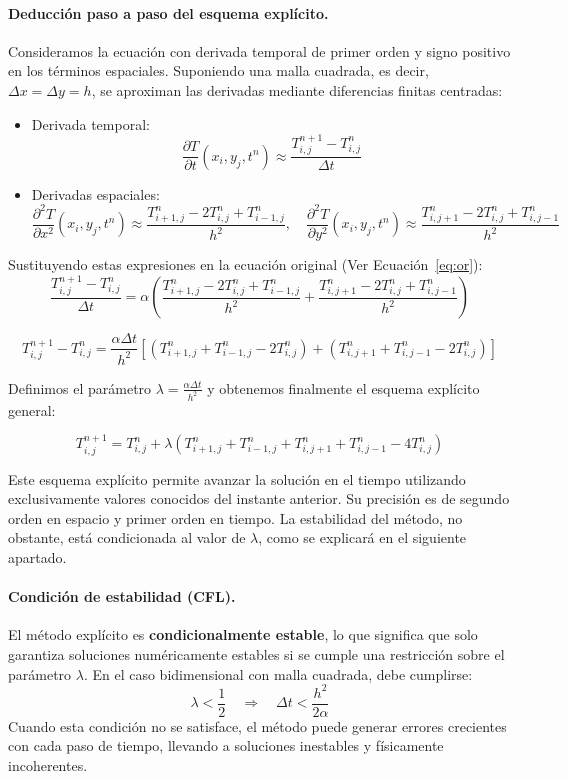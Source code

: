 \documentclass{article}
\begin{document}
\paragraph{Deducción paso a paso del esquema explícito.}
Consideramos la ecuación con derivada temporal de primer orden y signo positivo en los términos espaciales. Suponiendo una malla cuadrada, es decir, $\Delta x = \Delta y = h$, se aproximan las derivadas mediante diferencias finitas centradas:

\begin{itemize}
    \item Derivada temporal:
    $$
    \frac{\partial T}{\partial t}(x_i, y_j, t^n) \approx \frac{T_{i,j}^{n+1} - T_{i,j}^{n}}{\Delta t}
    $$
    \item Derivadas espaciales:
    $$
    \frac{\partial^2 T}{\partial x^2}(x_i, y_j, t^n) \approx \frac{T_{i+1,j}^n - 2T_{i,j}^n + T_{i-1,j}^n}{h^2}, \quad
    \frac{\partial^2 T}{\partial y^2}(x_i, y_j, t^n) \approx \frac{T_{i,j+1}^n - 2T_{i,j}^n + T_{i,j-1}^n}{h^2}
    $$
\end{itemize}

\noindent Sustituyendo estas expresiones en la ecuación original (Ver Ecuación~\ref{eq:or}):
\begin{equation}
    \frac{T_{i,j}^{n+1} - T_{i,j}^{n}}{\Delta t}
    = \alpha \left(
    \frac{T_{i+1,j}^n - 2T_{i,j}^n + T_{i-1,j}^n}{h^2}
    +
    \frac{T_{i,j+1}^n - 2T_{i,j}^n + T_{i,j-1}^n}{h^2}
    \right)
\end{equation}

$$
T_{i,j}^{n+1} - T_{i,j}^{n}
= \frac{\alpha \Delta t}{h^2} \left[
(T_{i+1,j}^n + T_{i-1,j}^n - 2T_{i,j}^n)
+
(T_{i,j+1}^n + T_{i,j-1}^n - 2T_{i,j}^n)
\right]
$$

\noindent Definimos el parámetro $\lambda = \frac{\alpha \Delta t}{h^2}$ y obtenemos finalmente el esquema explícito general:

$$
T_{i,j}^{n+1} = T_{i,j}^{n} + \lambda \left(
T_{i+1,j}^n + T_{i-1,j}^n + T_{i,j+1}^n + T_{i,j-1}^n - 4T_{i,j}^n
\right)
$$

Este esquema explícito permite avanzar la solución en el tiempo utilizando exclusivamente valores conocidos del instante anterior. Su precisión es de segundo orden en espacio y primer orden en tiempo. La estabilidad del método, no obstante, está condicionada al valor de $\lambda$, como se explicará en el siguiente apartado.

\paragraph{Condición de estabilidad (CFL).} El método explícito es \textbf{condicionalmente estable}, lo que significa que solo garantiza soluciones numéricamente estables si se cumple una restricción sobre el parámetro $\lambda$. En el caso bidimensional con malla cuadrada, debe cumplirse:
$$
\lambda < \frac{1}{2} \quad \Rightarrow \quad \Delta t < \frac{h^2}{2\alpha}
$$
Cuando esta condición no se satisface, el método puede generar errores crecientes con cada paso de tiempo, llevando a soluciones inestables y físicamente incoherentes.
\end{document}
